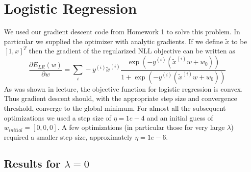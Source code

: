 \documentclass[10pt]{article}
\begin{document}
 



\section{Logistic Regression}



We used our gradient descent code from Homework 1 to solve this problem. In particular we supplied the optimizer with analytic gradients. If we define $\tilde{x}$ to be $[1,x]^T$ then the gradient of the regularized NLL objective can be written as
%
%
\begin{equation}
\frac{\partial E_{LR}(w)}{\partial w} = \sum_i -y^{(i)} \tilde{x}^{(i)} \frac{\exp(-y^{(i)}(\tilde{x}^{(i)}w + w_0))}{1 + \exp(-y^{(i)}(\tilde{x}^{(i)}w + w_0))}
\end{equation}
%
%
As was shown in lecture, the objective function for logistic regression is convex. Thus gradient descent should, with the appropriate step size and convergence threshold, converge to the global minimum. For almost all the subsequent optimizations we used a step size of $\eta = 1e-4$ and an initial guess of $w_{initial} = [0,0,0]$. A few optimizations (in particular those for very large $\lambda$) required a smaller step size, approximately $\eta = 1e-6$.

\subsection*{Results for $\lambda = 0$}
\end{document}
